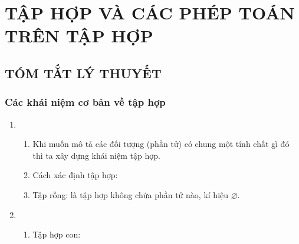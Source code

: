 \setcounter{dang}{0}
\setcounter{section}{1}
\setcounter{ex}{0}
\setcounter{vd}{0}
\setcounter{bt}{0}
\section{TẬP HỢP VÀ CÁC PHÉP TOÁN TRÊN TẬP HỢP}

\subsection{TÓM TẮT LÝ THUYẾT}

\subsubsection{Các khái niệm cơ bản về tập hợp}
\begin{enumerate}[\iconMT]
	\item {}
	\begin{enumerate}[\faPencilSquareO]
		\item Khi muốn mô tả các đối tượng (phần tử) có chung một tính chất gì đó thì ta xây dựng khái niệm tập hợp.
		\item Cách xác định tập hợp:
		\item Tập rỗng: là tập hợp không chứa phần tử nào, kí hiệu $\varnothing $.
	\end{enumerate}	
	\item {}
	\begin{enumerate}[\faPencilSquareO]
		\item Tập hợp con: 
		\begin{boxdn}
\end{boxdn}
\end{enumerate}
\end{enumerate}
